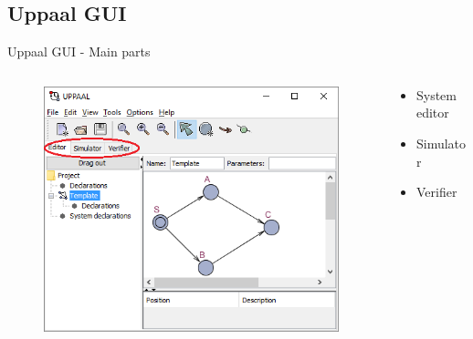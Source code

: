 \documentclass{beamer}
\begin{document}
\subsection{Uppaal GUI}
\begin{frame}{Uppaal GUI - Main parts}
\vspace{-10mm}
\begin{columns}
	\begin{column}{0.8\textwidth}
		\begin{figure}[H]
			\includegraphics[scale=0.7]{img/uppaal_gui_small_editor.png}
		\end{figure}
	\end{column}
	
	\begin{column}{0.3\textwidth}
		\begin{itemize}
			\item System editor
			\item Simulator
			\item Verifier
		\end{itemize}
	\end{column}
\end{columns}		
\end{frame}
\end{document}
